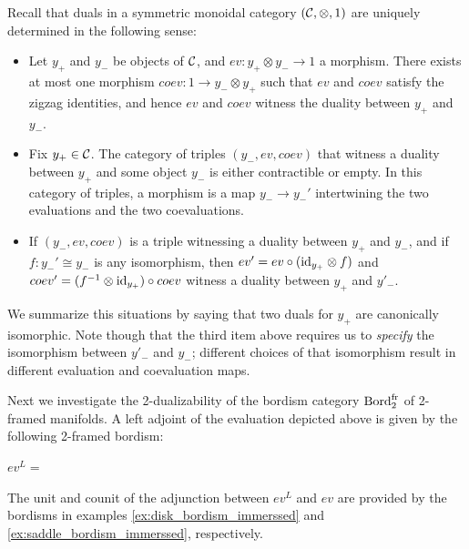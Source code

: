 \documentclass{amsart}
\begin{document}
\begin{remark}
Recall that duals in a symmetric monoidal category $(\mathcal C, \otimes, 1)$ are uniquely determined in the following sense:
\begin{itemize}
	\item Let $y_+$ and $ y_-$ be objects of $\mathcal C$, and $ev: y_+ \otimes y_- \to 1$ a morphism.  There exists at most one morphism $coev: 1 \to y_- \otimes y_+$ such that $ev$ and  $coev$ satisfy the zigzag identities, and hence $ev$ and $coev$ witness the duality between $y_+$ and $y_-$.
	\item Fix $y_+ \in \mathcal C$. The category of triples $(y_-, ev, coev)$ that witness a duality between $y_+$ and some object $y_-$ is either contractible or empty.  In this category of triples, a morphism is a map $y_- \to y_-'$ intertwining the two evaluations and the two coevaluations.  
	\item If $(y_-, ev, coev)$ is a triple witnessing a duality between $y_+$ and $y_-$, and if $f:y_-' \cong y_-$ is any isomorphism, then $ev' = ev \circ (\mathrm{id}_{y_+} \otimes f)$ and $coev' = (f^{-1} \otimes \mathrm{id}_{y_+}) \circ coev$ witness a duality between $y_+$ and $y'_-$.  
\end{itemize}
We summarize this situations by saying that two duals for $y_+$ are canonically isomorphic.  Note though that the third item above requires us to {\em specify} the isomorphism between $y'_-$ and $y_-$; different choices of that isomorphism result in different evaluation and coevaluation maps.
\end{remark}

Next we investigate the 2-dualizability of the bordism category $\mathrm{Bord}^\mathrm{fr}_2$ of 2-framed manifolds.  A left adjoint of the evaluation depicted above is given by the following 2-framed bordism:
\begin{center}
	$ev^L = $ 
\end{center}
The unit and counit of the adjunction between $ev^L$ and $ev$ are provided by the bordisms in examples \ref{ex:disk_bordism_immerssed} and \ref{ex:saddle_bordism_immerssed}, respectively. 
\end{document}
